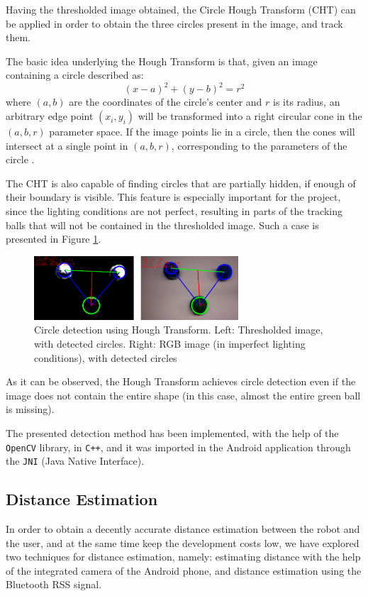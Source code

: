 \documentclass[journal]{IEEEtran}
\let\MYoriglatexcaption\caption
\renewcommand{\caption}[2][\relax]{\MYoriglatexcaption[#2]{#2}}
\begin{document}
Having the thresholded image obtained, the Circle Hough Transform (CHT) can be applied in order to obtain the three circles present in the image, and track them.

The basic idea underlying the Hough Transform is that, given an image containing a circle described as:
\begin{equation}
\left(x-a\right)^2 + \left(y-b\right)^2 = r^2
\end{equation}
where $(a,b)$ are the coordinates of the circle's center and $r$ is its radius, an arbitrary edge point $(x_i, y_i)$ will be transformed into a right circular cone in the $(a,b,r)$ parameter space. If the image points lie in a circle, then the cones will intersect at a single point in $(a,b,r)$, corresponding to the parameters of the circle \cite{yuen1990cht}.

The CHT is also capable of finding circles that are partially hidden, if enough of their boundary is visible. This feature is especially important for the project, since the lighting conditions are not perfect, resulting in parts of the tracking balls that will not be contained in the thresholded image. Such a case is presented in Figure \ref{fig:cht}.
\begin{figure}[!htpb]
\centering
\includegraphics[width=3in]{images/cht_incomplete}
\caption{Circle detection using Hough Transform. Left: Thresholded image, with detected circles. Right: RGB image (in imperfect lighting conditions), with detected circles}
\label{fig:cht}
\end{figure}

As it can be observed, the Hough Transform achieves circle detection even if the image does not contain the entire shape (in this case, almost the entire green ball is missing).

The presented detection method has been implemented, with the help of the \texttt{OpenCV} library, in \texttt{C++}, and it was imported in the Android application through the \texttt{JNI} (Java Native Interface).

\subsection{Distance Estimation}
In order to obtain a decently accurate distance estimation between the robot and the user, and at the same time keep the development costs low, we have explored two techniques for distance estimation, namely: estimating distance with the help of the integrated camera of the Android phone, and distance estimation using the Bluetooth RSS signal.
\end{document}
